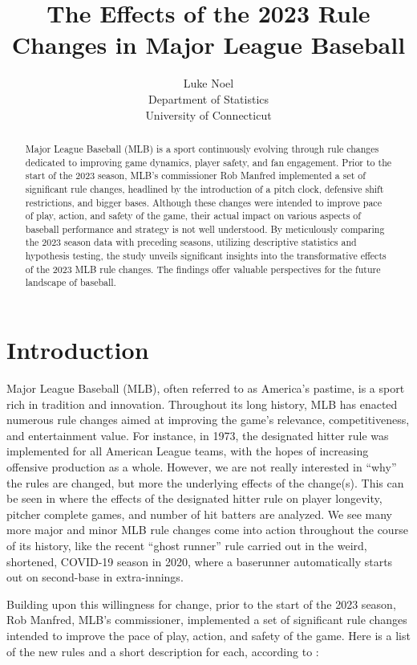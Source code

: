 \documentclass[12pt]{article}
\title{The Effects of the 2023 Rule Changes in Major League Baseball}
\author{Luke Noel\\
  Department of Statistics\\
  University of Connecticut
}
\begin{document}
\maketitle

\begin{abstract}
Major League Baseball (MLB) is a sport continuously evolving through rule
changes dedicated to improving game dynamics, player safety, and fan engagement.
Prior to the start of the 2023 season, MLB's commissioner Rob Manfred
implemented a set of significant rule changes, headlined by the introduction of 
a pitch clock, defensive shift restrictions, and bigger bases. Although these
changes were intended to improve pace of play, action, and safety of the game,
their actual impact on various aspects of baseball performance and strategy is 
not well understood. By meticulously comparing the 2023 season data with preceding seasons, 
utilizing descriptive statistics and hypothesis testing, the study unveils significant
insights into the transformative effects of the 2023 MLB rule changes. The findings
offer valuable perspectives for the future landscape of baseball.
\end{abstract}


\section{Introduction}
\label{sec:intro}

Major League Baseball (MLB), often referred to as America's pastime, is a sport
rich in tradition and innovation. Throughout its long history, MLB has enacted
numerous rule changes aimed at improving the game's relevance, competitiveness,
and entertainment value. For instance, in 1973, the designated hitter rule was
implemented for all American League teams, with the hopes of increasing
offensive production as a whole. However, we are not really interested in ``why''
the rules are changed, but more the underlying effects of the change(s). This
can be seen in \citet{Cooley} where the effects of the designated hitter rule
on player longevity, pitcher complete games, and number of hit batters are
analyzed. We see many more major and minor MLB rule changes come into action
throughout the course of its history, like the recent ``ghost runner'' rule
carried out in the weird, shortened, COVID-19 season in 2020, where a baserunner 
automatically starts out on second-base in extra-innings.

Building upon this willingness for change, prior to the start of the 2023 season,
Rob Manfred, MLB's commissioner, implemented a set of significant rule changes
intended to improve the pace of play, action, and safety of the game. Here is
a list of the new rules and a short description for each, according to \citet{Castrovince}:
\end{document}
